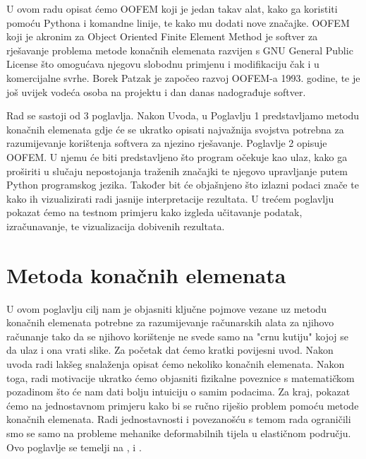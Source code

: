 \documentclass[a4paper,twoside,12pt]{memoir} %
\begin{document}
\begin{intro}
U ovom radu opisat ćemo OOFEM koji je jedan takav alat, kako ga koristiti pomoću Pythona i komandne linije, te kako mu dodati nove značajke. OOFEM koji je akronim za Object Oriented Finite Element Method je softver za rješavanje problema metode konačnih elemenata razvijen s GNU General Public License što omogućava njegovu slobodnu primjenu i modifikaciju čak i u komercijalne svrhe. Borek Patzak je  započeo razvoj OOFEM-a 1993. godine, te je još uvijek vodeća osoba na projektu i dan danas nadograđuje softver. \par

Rad se sastoji od 3 poglavlja. Nakon Uvoda, u Poglavlju 1 predstavljamo metodu konačnih elemenata gdje će se ukratko opisati najvažnija svojstva potrebna za razumijevanje korištenja softvera za njezino rješavanje. Poglavlje 2 opisuje OOFEM. U njemu će biti predstavljeno što program očekuje kao ulaz, kako ga proširiti u slučaju nepostojanja traženih značajki te njegovo upravljanje putem Python programskog jezika. Također bit će objašnjeno što izlazni podaci znače te kako ih vizualizirati radi jasnije interpretacije rezultata. U trećem poglavlju pokazat ćemo na testnom primjeru kako izgleda učitavanje podatak, izračunavanje, te vizualizacija dobivenih rezultata.

\end{intro}


\chapter{Metoda konačnih elemenata}	
U ovom poglavlju cilj nam je objasniti ključne pojmove vezane uz metodu konačnih elemenata potrebne za razumijevanje računarskih alata za njihovo računanje tako da se njihovo korištenje ne svede samo na "crnu kutiju" kojoj se da ulaz i ona vrati slike. Za početak dat ćemo kratki povijesni uvod. Nakon uvoda radi lakšeg snalaženja opisat ćemo nekoliko konačnih elemenata. Nakon toga, radi motivacije ukratko ćemo objasniti fizikalne poveznice s matematičkom pozadinom što će nam dati bolju intuiciju o samim podacima. Za kraj, pokazat ćemo na jednostavnom primjeru kako bi se ručno riješio problem pomoću metode konačnih elemenata. Radi jednostavnosti i povezanošću s temom rada ograničili smo se samo na probleme mehanike deformabilnih tijela u elastičnom području. Ovo poglavlje se temelji na \cite{jurica_soric}, \cite{coursera} i \cite{wiki_fem_18}.
\end{document}
